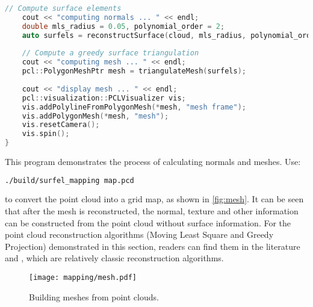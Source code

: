 \begin{lstlisting}[language=c++,caption=slambook2/ch12/dense_RGBD/surfel_mapping.cpp]
	// Compute surface elements
	cout << "computing normals ... " << endl;
	double mls_radius = 0.05, polynomial_order = 2;
	auto surfels = reconstructSurface(cloud, mls_radius, polynomial_order);
	
	// Compute a greedy surface triangulation
	cout << "computing mesh ... " << endl;
	pcl::PolygonMeshPtr mesh = triangulateMesh(surfels);
	
	cout << "display mesh ... " << endl;
	pcl::visualization::PCLVisualizer vis;
	vis.addPolylineFromPolygonMesh(*mesh, "mesh frame");
	vis.addPolygonMesh(*mesh, "mesh");
	vis.resetCamera();
	vis.spin();
}
\end{lstlisting}

This program demonstrates the process of calculating normals and meshes. Use:
\begin{lstlisting}[language=sh,caption=Terminal input:]
	./build/surfel_mapping map.pcd
\end{lstlisting}
to convert the point cloud into a grid map, as shown in \autoref{fig:mesh}. It can be seen that after the mesh is reconstructed, the normal, texture and other information can be constructed from the point cloud without surface information. For the point cloud reconstruction algorithms (Moving Least Square and Greedy Projection) demonstrated in this section, readers can find them in the literature \cite{Alexa2003} and \cite{Marton2009}, which are relatively classic reconstruction algorithms.

\begin{figure}[!htp]
	\centering
	\texttt{[image: mapping/mesh.pdf]}
	\caption{Building meshes from point clouds.}
	\label{fig:mesh}
\end{figure}

